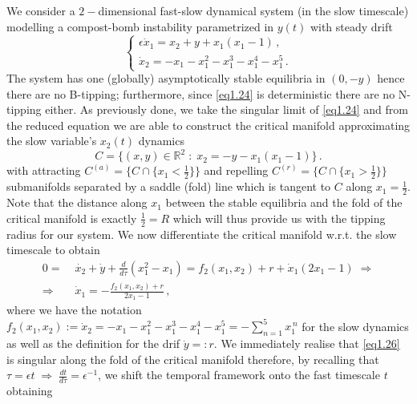 \documentclass[../main.tex]{subfiles}
\begin{document}
\begin{example}[label=ex1.4]{}{}
     We consider a $2-$dimensional fast-slow dynamical system (in the slow timescale) modelling a compost-bomb instability parametrized in $y(t)$ with steady drift
     \begin{equation}\label{eq1.24}
        \begin{cases}
            \epsilon\dot{x}_{1} = x_{2} + y + x_{1}(x_{1}-1)\,, \\
            \dot{x}_{2} = - x_{1} - x_{1}^{2} - x_{1}^{3} - x_{1}^{4} - x_{1}^{5}\,. 
        \end{cases}
     \end{equation}
    The system has one (globally) asymptotically stable equilibria in $(0,-y)$ hence there are no B-tipping; furthermore, since \eqref{eq1.24} is deterministic there are no N-tipping either. As previously done, we take the singular limit of \eqref{eq1.24} and from the reduced equation we are able to construct the critical manifold approximating the slow variable's $x_{2}(t)$ dynamics 
    \begin{equation}\label{eq1.25}
            C=\{(x,y)\in \mathbb{R}^{2}\;:\;x_{2}=-y-x_{1}(x_{1}-1)\}\,.
    \end{equation}
    with attracting $C^{(a)}=\{C\cap\{x_{1}<\frac{1}{2}\}\}$ and repelling $C^{(r)}=\{C\cap\{x_{1}>\frac{1}{2}\}\}$ submanifolds separated by a saddle (fold) line which is tangent to $C$ along $x_{1}=\frac{1}{2}$. Note that the distance along $x_{1}$ between the stable equilibria and the fold of the critical manifold is exactly $\frac{1}{2}=R$ which will thus provide us with the tipping radius for our system.
We now differentiate the critical manifold w.r.t. the slow timescale to obtain
\begin{align}
        0 =&\;\dot{x_{2}} + \dot{y} + \frac{d}{d\tau}(x_{1}^{2}-x_{1}) = f_{2}(x_{1}, x_{2}) + r + \dot{x}_{1}(2x_{1}-1)\;\Rightarrow \nonumber \\
        \Rightarrow&\;\dot{x}_{1}=-\frac{f_{2}(x_{1}, x_{2})+r}{2x_{1}-1} \,, \label{eq1.26} 
\end{align}
where we have the notation $f_{2}(x_{1}, x_{2}):=\dot{x}_{2}=- x_{1} - x_{1}^{2} - x_{1}^{3} - x_{1}^{4} - x_{1}^{5} = -\sum_{n=1}^{5}x_{1}^{\,n}$ for the slow dynamics as well as the definition for the drif $\dot{y} =: r$.
We immediately realise that \eqref{eq1.26} is singular along the fold of the critical manifold therefore, by recalling that $\tau = \epsilon t\;\Rightarrow\;\frac{dt}{d\tau}=\epsilon^{-1}$, we shift the temporal framework onto the fast timescale $t$ obtaining

\end{example}
\end{document}
